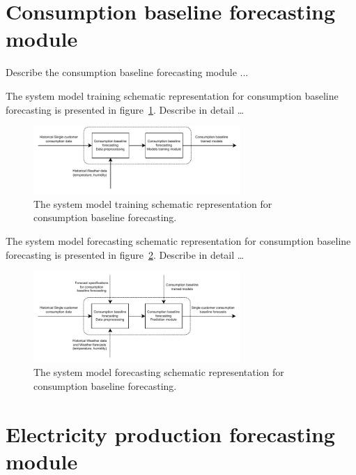 \section{Consumption baseline forecasting module}
\label{sec:baselinemodel}
\vspace{0.2 cm}

Describe the consumption baseline forecasting module ...

The system model training schematic representation for consumption baseline forecasting is presented in figure~\ref{fig:modeltrainingbaseline}.
Describe in detail …

\begin{figure}[H]
\centering
\includegraphics[width=0.7\textwidth]{images/system_model_training_baseline}
\caption{The system model training schematic representation for consumption baseline forecasting.}
\label{fig:modeltrainingbaseline}
\end{figure}

The system model forecasting schematic representation for consumption baseline forecasting is presented in figure~\ref{fig:modelforecastingbaseline}.
Describe in detail …

\begin{figure}[H]
\centering
\includegraphics[width=0.7\textwidth]{images/system_model_forecasting_baseline}
\caption{The system model forecasting schematic representation for consumption baseline forecasting.}
\label{fig:modelforecastingbaseline}
\end{figure}


\section{Electricity production forecasting module}
\label{sec:productionmodel}
\vspace{0.2 cm}

